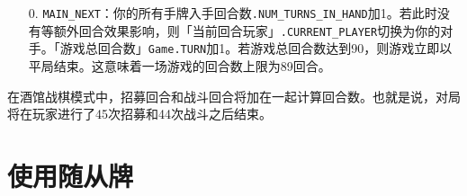 \begin{enumerate}
    \item[0.] \texttt{MAIN\_NEXT}：你的所有手牌入手回合数\texttt{.NUM\_TURNS\_IN\_HAND}加1。若此时没有等额外回合效果影响，则「当前回合玩家」\texttt{.CURRENT\_PLAYER}切换为你的对手。「游戏总回合数」\texttt{Game.TURN}加1。若游戏总回合数达到90，则游戏立即以平局结束。这意味着一场游戏的回合数上限为89回合。
\end{enumerate}

在酒馆战棋模式中，招募回合和战斗回合将加在一起计算回合数。也就是说，对局将在玩家进行了45次招募和44次战斗之后结束。

\section{使用随从牌}

